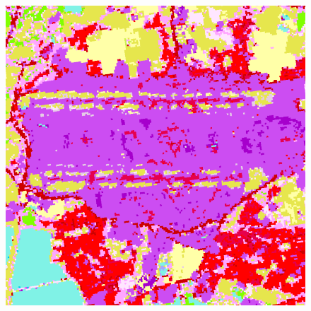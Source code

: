 \begin{figure}[H]
\begin{minipage}{0.48\textwidth}
                \includegraphics[width=\linewidth]{figs_06/heathrow_lulc.png}
            \end{minipage}
            \hfill
            \begin{minipage}{0.5\textwidth}
                \centering

\end{minipage}
\end{figure}
